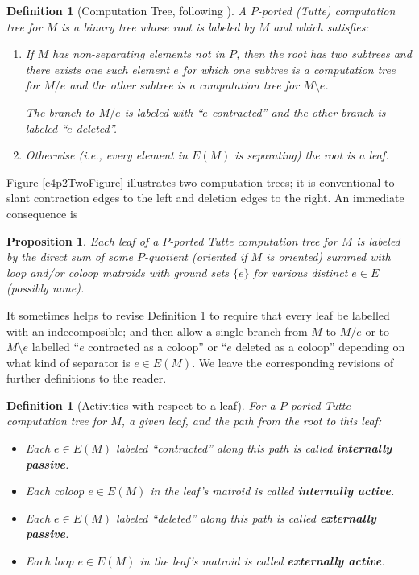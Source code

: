 \documentclass[12pt,leqno]{amsart}
\newtheorem{prop}[lem]{Proposition}
\newtheorem{definition}[lem]{Definition}
\theoremstyle{remark}
\begin{document}
\begin{definition}[Computation Tree, following \cite{GordonMcMachonGreedoid}]
\label{CompTreeDef}
A $P$-ported (Tutte) computation tree for $M$ is a
binary tree whose root is labeled by $M$ and which satisfies:
\begin{enumerate}
\item If $M$ has non-separating elements not in $P$, then 
the root has two subtrees and there exists one such element $e$ for which 
one subtree is a computation tree
for $M/e$ and the other subtree is a computation tree for 
$M\setminus e$.

The branch to $M/e$ is labeled with ``$e$ contracted'' and 
the other branch is labeled ``$e$ deleted''.
\item Otherwise (i.e., every element in $E(M)$
is separating) the root is a leaf.
\end{enumerate}
\end{definition}

Figure \ref{c4p2TwoFigure} illustrates two computation trees; it 
is conventional to slant contraction edges to the left and
deletion edges to the right.
An immediate consequence is
\begin{prop}
Each leaf of a $P$-ported Tutte computation tree for $M$
is labeled by the direct sum of some $P$-quotient
(oriented if $M$ is oriented) 
summed with loop and/or coloop matroids with 
ground sets $\{e\}$ for various distinct $e\in E$ (possibly none).
\end{prop}

It sometimes helps to revise Definition \ref{CompTreeDef} to require
that every leaf be labelled with an indecomposible; and then allow
a single branch from $M$ to $M/e$ or to $M\setminus e$
labelled ``$e$ contracted as a coloop'' or ``$e$ deleted as a coloop'' 
depending on what kind of separator is $e\in E(M)$.  We leave
the corresponding revisions of further definitions to the reader.


\begin{definition}[Activities with respect to a leaf]
\label{ActivityTreeDef}
For a $P$-ported Tutte computation tree for $M$,
a given leaf, and the path from the root to this leaf:
\begin{itemize}
\item Each $e\in E(M)$ labeled ``contracted'' along this path
is called \textbf{internally passive}.
\item Each coloop $e\in E(M)$ in the leaf's matroid is
called \textbf{internally active}.
\item Each $e\in E(M)$ labeled ``deleted'' along this path
is called \textbf{externally passive}.
\item Each loop $e\in E(M)$ in the leaf's matroid is
called \textbf{externally active}.
\end{itemize}
\end{definition}
\end{document}

